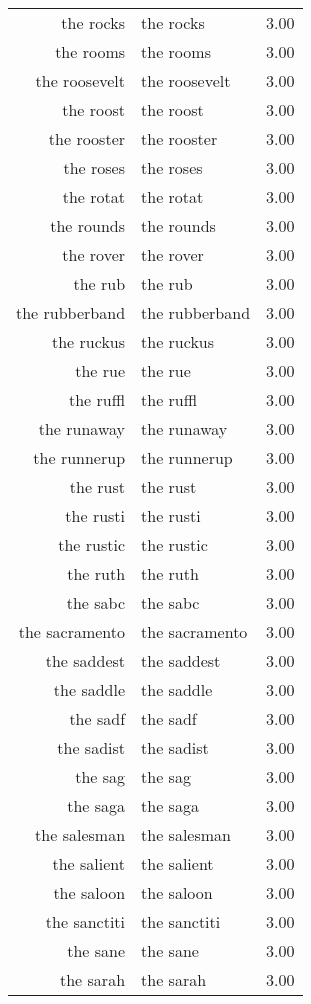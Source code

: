 \begin{table}[ht]
\begin{tabular}{rlr}
  the rocks & the rocks & 3.00 \\ 
  the rooms & the rooms & 3.00 \\ 
  the roosevelt & the roosevelt & 3.00 \\ 
  the roost & the roost & 3.00 \\ 
  the rooster & the rooster & 3.00 \\ 
  the roses & the roses & 3.00 \\ 
  the rotat & the rotat & 3.00 \\ 
  the rounds & the rounds & 3.00 \\ 
  the rover & the rover & 3.00 \\ 
  the rub & the rub & 3.00 \\ 
  the rubberband & the rubberband & 3.00 \\ 
  the ruckus & the ruckus & 3.00 \\ 
  the rue & the rue & 3.00 \\ 
  the ruffl & the ruffl & 3.00 \\ 
  the runaway & the runaway & 3.00 \\ 
  the runnerup & the runnerup & 3.00 \\ 
  the rust & the rust & 3.00 \\ 
  the rusti & the rusti & 3.00 \\ 
  the rustic & the rustic & 3.00 \\ 
  the ruth & the ruth & 3.00 \\ 
  the sabc & the sabc & 3.00 \\ 
  the sacramento & the sacramento & 3.00 \\ 
  the saddest & the saddest & 3.00 \\ 
  the saddle & the saddle & 3.00 \\ 
  the sadf & the sadf & 3.00 \\ 
  the sadist & the sadist & 3.00 \\ 
  the sag & the sag & 3.00 \\ 
  the saga & the saga & 3.00 \\ 
  the salesman & the salesman & 3.00 \\ 
  the salient & the salient & 3.00 \\ 
  the saloon & the saloon & 3.00 \\ 
  the sanctiti & the sanctiti & 3.00 \\ 
  the sane & the sane & 3.00 \\ 
  the sarah & the sarah & 3.00 \\ 

\end{tabular}
\end{table}
